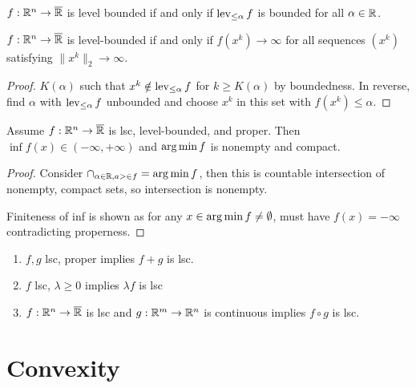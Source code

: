 \begin{defn}
  \label{sec:existence-9}
  $f: \mathbb{R}^{n} \rightarrow \overline {\mathbb{R}}$ is level bounded if and only if
  $\operatorname*{lev}_{\leq \alpha} f$ is bounded for all $\alpha \in \mathbb{R}$.
\end{defn}

\begin{thm}
  \label{sec:existence-10}
  $f: \mathbb{R}^{n} \rightarrow \overline {\mathbb{R}}$ is level-bounded if and only if
  $f(x^{k}) \rightarrow \infty$ for all sequences $(x^{k})$ satisfying
  $\| x^{k} \|_{2} \rightarrow \infty$.
\end{thm}

\begin{proof}
  $K(\alpha)$ such that $x^{k} \notin \operatorname*{lev}_{\leq \alpha} f$  for $k
  \geq K(\alpha)$ by boundedness. In reverse, find $\alpha$ with $\operatorname*{lev}
 _{\leq \alpha} f $ unbounded and choose $x^{k}$ in this set with
 $f(x^{k}) \leq \alpha$.
\end{proof}

\begin{thm}
  \label{sec:existence-11}
  Assume $f: \mathbb{R}^{n} \rightarrow \overline {\mathbb{R}}$ is lsc, level-bounded,
  and proper.  Then $\inf f(x) \in (-\infty, +\infty)$ and $\operatorname*{arg\,min} f$
  is nonempty and compact.
\end{thm}

\begin{proof}
  Consider $\cap_{\alpha \in \mathbb{R}, a > \in f} = \operatorname*{arg\,min} f$, then this is
  countable intersection of nonempty, compact sets, so intersection is
  nonempty.

  Finiteness of inf is shown as for any $x \in \operatorname*{arg\,min} f \neq
  \emptyset$, must have $f(x) = -\infty$ contradicting properness.
\end{proof}

\begin{thm}
  \label{sec:existence-12}
  \begin{enumerate}
  \item $f, g$ lsc, proper implies $f + g$ is lsc.
  \item $f$ lsc, $\lambda \geq 0$ implies $\lambda f$ is lsc
  \item $f: \mathbb{R}^{n} \rightarrow \overline {\mathbb{R}}$ is lsc and $g: \mathbb{R}^{m}
    \rightarrow \mathbb{R}^{n}$ is continuous implies $f \circ g$ is lsc.
  \end{enumerate}
\end{thm}

\section{Convexity}
\label{sec:convexity}

